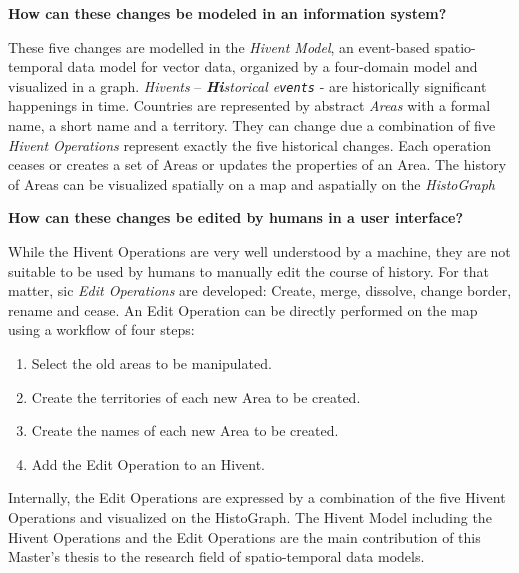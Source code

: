 \begin{description}[labelindent=0.1em]
  \item[\textbf{2a)}]
  \textbf{
    How can these changes be modeled in an information system?
  }
\end{description}

These five changes are modelled in the \emph{Hivent Model}, an event-based spatio-temporal data model for vector data, organized by a four-domain model and visualized in a graph.
\emph{Hivents} -- \emph{\textbf{Hi}storical e\texttt{vents}} - are historically significant happenings in time.
Countries are represented by abstract \emph{Areas} with a formal name, a short name and a territory. They can change due a combination of five \emph{Hivent Operations} represent exactly the five historical changes. Each operation ceases or creates a set of Areas or updates the properties of an Area.
The history of Areas can be visualized spatially on a map and aspatially on the \emph{HistoGraph}

\begin{description}[labelindent=0.1em]
  \item[\textbf{2b)}]
  \textbf{
    How can these changes be edited by humans in a user interface?
  }
\end{description}

While the Hivent Operations are very well understood by a machine, they are not suitable to be used by humans to manually edit the course of history. For that matter, sic \emph{Edit Operations} are developed: Create, merge, dissolve, change border, rename and cease. An Edit Operation can be directly performed on the map using a workflow of four steps:

\begin{enumerate}
  \item Select the old areas to be manipulated.
  \item Create the territories of each new Area to be created.
  \item Create the names of each new Area to be created.
  \item Add the Edit Operation to an Hivent.
\end{enumerate}

Internally, the Edit Operations are expressed by a combination of the five Hivent Operations and visualized on the HistoGraph. The Hivent Model including the Hivent Operations and the Edit Operations are the main contribution of this Master's thesis to the research field of spatio-temporal data models.

